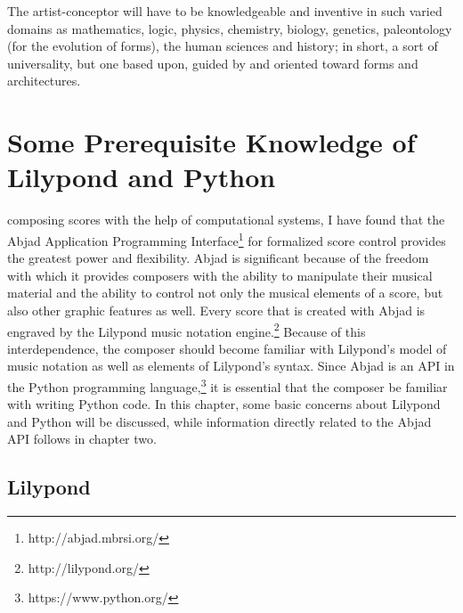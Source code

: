 \singlespace
\begin{savequote}[75mm] %
The artist-conceptor will have to be knowledgeable and inventive in such varied domains as mathematics, logic, physics, chemistry, biology, genetics, paleontology (for the evolution of forms), the human sciences and history; in short, a sort of universality, but one based upon, guided by and oriented toward forms and architectures. \\
\citeyearpar[Arts/Sciences: Alloys p.3]{Xenakis}
\end{savequote}

\chapter{Some Prerequisite Knowledge of Lilypond and Python}
\doublespace
{} composing scores with the help of computational systems, I have found that the Abjad Application Programming Interface\footnote{http://abjad.mbrsi.org/} for formalized score control provides the greatest power and flexibility. Abjad is significant because of the freedom with which it provides composers with the ability to manipulate their musical material and the ability to control not only the musical elements of a score, but also other graphic features as well. Every score that is created with Abjad is engraved by the Lilypond music notation engine.\footnote{http://lilypond.org/} Because of this interdependence, the composer should become familiar with Lilypond’s model of music notation as well as elements of Lilypond's syntax. Since Abjad is an API in the Python programming language,\footnote{https://www.python.org/} it is essential that the composer be familiar with writing Python code. In this chapter, some basic concerns about Lilypond and Python will be discussed, while information directly related to the Abjad API follows in chapter two.

	\section{Lilypond}

\pagestyle{fancy}
\renewcommand\headrulewidth{0pt}
\lhead{}\chead{}\rhead{\thepage}
\cfoot{}
